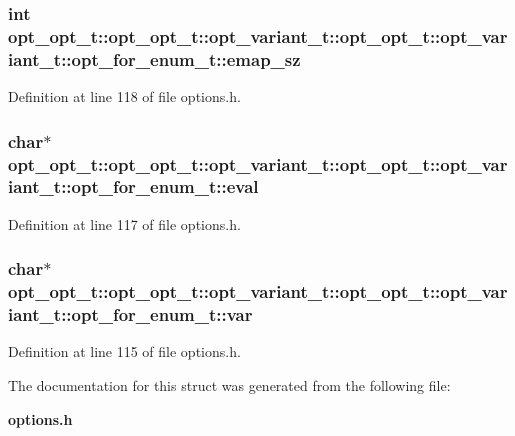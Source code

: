 \subsubsection[{emap\_\-sz}]{\setlength{\rightskip}{0pt plus 5cm}int opt\_\-opt\_\-t::opt\_\-opt\_\-t::opt\_\-variant\_\-t::opt\_\-opt\_\-t::opt\_\-variant\_\-t::opt\_\-for\_\-enum\_\-t::emap\_\-sz}\label{structopt__opt__t_1_1opt__variant__t_1_1opt__for__enum__t_470f11f759e14dcff7164029c907595b}




Definition at line 118 of file options.h.
\subsubsection[{eval}]{\setlength{\rightskip}{0pt plus 5cm}char$\ast$ opt\_\-opt\_\-t::opt\_\-opt\_\-t::opt\_\-variant\_\-t::opt\_\-opt\_\-t::opt\_\-variant\_\-t::opt\_\-for\_\-enum\_\-t::eval}\label{structopt__opt__t_1_1opt__variant__t_1_1opt__for__enum__t_824a1adb6418a788936daccb4e50c254}




Definition at line 117 of file options.h.
\subsubsection[{var}]{\setlength{\rightskip}{0pt plus 5cm}char$\ast$ opt\_\-opt\_\-t::opt\_\-opt\_\-t::opt\_\-variant\_\-t::opt\_\-opt\_\-t::opt\_\-variant\_\-t::opt\_\-for\_\-enum\_\-t::var}\label{structopt__opt__t_1_1opt__variant__t_1_1opt__for__enum__t_690f79757f0563ce65fe93a22e0490a8}




Definition at line 115 of file options.h.

The documentation for this struct was generated from the following file:\begin{CompactItemize}
\item 
{\bf options.h}\end{CompactItemize}
